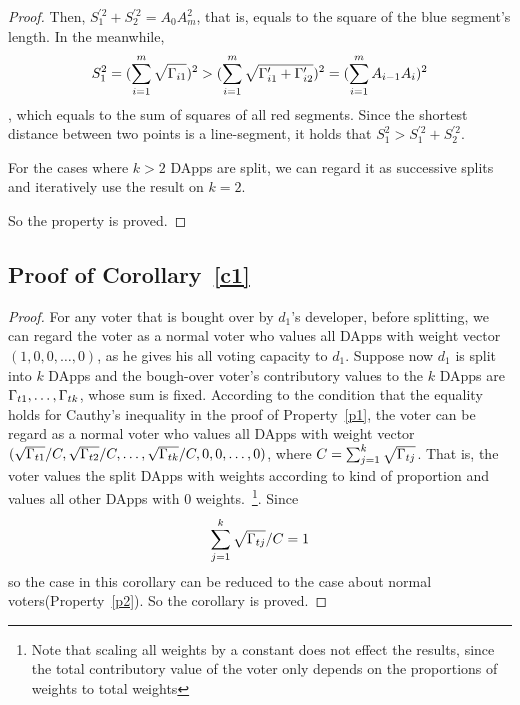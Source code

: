 \begin{proof}
   	Then, $S_1^{'2}+S_2^{'2}=A_0A_m^2$, that is, equals to the square of the blue segment's length. In the meanwhile,
   	 $$S_1^2 = (\sum_{i=1}^m \sqrt{\Gamma_{i1}})^2 > (\sum_{i=1}^m \sqrt{\Gamma'_{i1}+\Gamma'_{i2}})^2 = (\sum_{i=1}^m A_{i-1}A_i)^2$$,
   	 which equals to the sum of squares of all red segments. Since the shortest distance between two points is a line-segment, it holds that $S_1^2 >S_1^{'2}+S_2^{'2}$.

   	 For the cases where $k>2$ DApps are split, 	we can regard it as successive splits and iteratively use the result on $k=2$.

   	 So the property is proved.

\end{proof}

\subsection{Proof of Corollary~\ref{c1}}
\label{subsection:proof3}
\begin{proof}
	For any voter that is bought over by $d_1$'s developer, before splitting, we
	can regard the voter as a normal voter who values all DApps with weight
	vector $(1,0,0,\ldots,0)$, as he gives his all voting capacity to $d_1$.
	Suppose now $d_1$ is split into $k$ DApps and the bough-over voter's
	contributory values to the $k$ DApps are $\Gamma_{t1},\ldots,\Gamma_{tk}$, whose
	sum is fixed. According to the condition that the equality holds for Cauthy's
	inequality in the proof of Property~\ref{p1}, the voter can be regard as a
	normal voter who values all DApps with weight vector
	$(\sqrt{\Gamma_{t1}}/C,\sqrt{\Gamma_{t2}}/C,\ldots, \sqrt{\Gamma_{tk}}/C,0,0,\ldots,0)$, where $C=\sum_{j=1}^k \sqrt{\Gamma_{tj}}$. That is, the voter values the split DApps with weights according to kind of proportion and values all other DApps with 0 weights.~\footnote{Note that scaling all weights by a constant does not effect the results, since the total contributory value of the voter only depends on the proportions of weights to total weights}. Since
		$$\sum_{j=1}^k \sqrt{\Gamma_{tj}}/C =1$$
	so the case in this corollary can be reduced to the case about normal voters(Property~\ref{p2}). So the corollary is proved.
\end{proof}

